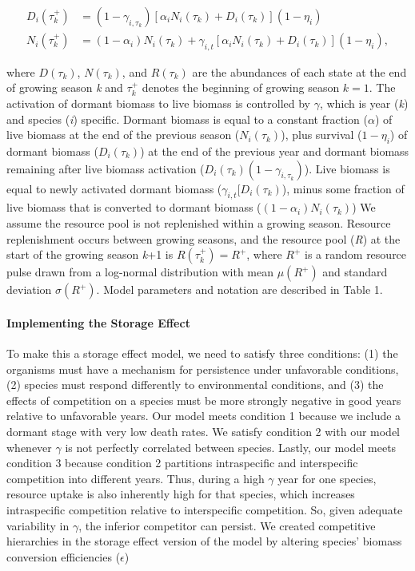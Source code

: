 \documentclass[12pt,]{article}
\begin{document}
\begin{align}
  D_{i}(\tau_k^+) &= (1-\gamma_{i,\tau_k})[\alpha_i N_{i}(\tau_k) + D_{i}(\tau_k)](1-\eta_i) \\
  N_{i}(\tau_k^+) &= (1-\alpha_i)N_{i}(\tau_k) + \gamma_{i,t}[\alpha_i N_{i}(\tau_k) + D_{i}(\tau_k)] (1-\eta_i),
\end{align}

\noindent where \(D(\tau_k)\), \(N(\tau_k)\), and \(R(\tau_k)\) are the
abundances of each state at the end of growing season \emph{k} and
\(\tau_k^+\) denotes the beginning of growing season \(k=1\). The
activation of dormant biomass to live biomass is controlled by
\(\gamma\), which is year (\emph{k}) and species (\emph{i}) specific.
Dormant biomass is equal to a constant fraction (\(\alpha\)) of live
biomass at the end of the previous season (\(N_{i}(\tau_k)\)), plus
survival (\(1-\eta_i\)) of dormant biomass (\(D_{i}(\tau_k)\)) at the
end of the previous year and dormant biomass remaining after live
biomass activation (\(D_{i}(\tau_k)(1-\gamma_{i,\tau_k})\)). Live
biomass is equal to newly activated dormant biomass
(\(\gamma_{i,t}[D_{i}(\tau_k)\)), minus some fraction of live biomass
that is converted to dormant biomass (\((1-\alpha_i)N_{i}(\tau_k)\)) We
assume the resource pool is not replenished within a growing season.
Resource replenishment occurs between growing seasons, and the resource
pool (\emph{R}) at the start of the growing season \emph{k}+1 is
\(R(\tau_k^+) = R^+\), where \(R^+\) is a random resource pulse drawn
from a log-normal distribution with mean \(\mu(R^+)\) and standard
deviation \(\sigma(R^+)\). Model parameters and notation are described
in Table 1.

\paragraph{Implementing the Storage
Effect}\label{implementing-the-storage-effect}

To make this a storage effect model, we need to satisfy three
conditions: (1) the organisms must have a mechanism for persistence
under unfavorable conditions, (2) species must respond differently to
environmental conditions, and (3) the effects of competition on a
species must be more strongly negative in good years relative to
unfavorable years. Our model meets condition 1 because we include a
dormant stage with very low death rates. We satisfy condition 2 with our
model whenever \(\gamma\) is not perfectly correlated between species.
Lastly, our model meets condition 3 because condition 2 partitions
intraspecific and interspecific competition into different years. Thus,
during a high \(\gamma\) year for one species, resource uptake is also
inherently high for that species, which increases intraspecific
competition relative to interspecific competition. So, given adequate
variability in \(\gamma\), the inferior competitor can persist. We
created competitive hierarchies in the storage effect version of the
model by altering species' biomass conversion efficiencies
(\(\epsilon\))
\end{document}
